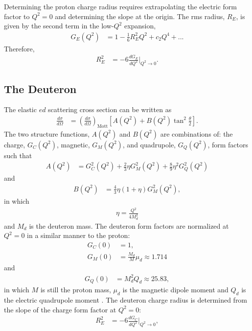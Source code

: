\documentclass[aps,prd,twocolumn,groupedaddress,10pt]{revtex4-1}
\begin{document}
Determining the proton charge radius requires extrapolating the electric form factor to $Q^2=0$ and determining the slope at the origin. The rms radius, $R_E$, is given by the second term in the low-$Q^2$ expansion,
\begin{align}
G_E(Q^2) &= 1- \frac{1}{6}R_E^2Q^2+c_2 Q^4 + ...
\end{align}
Therefore,
\begin{align*}
R_E^2 &= -6 \frac{dG_E}{dQ^2} \bigg|_{Q^2\rightarrow0}.
\end{align*}

\subsection{The Deuteron}

The elastic $ed$ scattering cross section can be written as
\begin{align}
\frac{d\sigma}{d\Omega} &= \left( \frac{d\sigma}{d\Omega} \right)_\text{Mott} \left[ A(Q^2) + B(Q^2) \tan^2 \frac{\theta}{2} \right].
\end{align}
The two structure functions, $A(Q^2)$ and $B(Q^2)$ are combinations of: the charge, $G_C(Q^2)$, magnetic, $G_M(Q^2)$, and quadrupole, $G_Q(Q^2)$, form factors such that
\begin{align}
A(Q^2) &= G_C^2(Q^2) + \frac{2}{3} \eta G_M^2(Q^2) + \frac{8}{9} \eta^2 G_Q^2(Q^2)
\end{align}
and
\begin{align}
B(Q^2) &= \frac{4}{3} \eta (1+\eta) G_M^2(Q^2),
\end{align}
in which
\begin{align}
\eta = \frac{Q^2}{4M_d^2}
\end{align}
and $M_d$ is the deuteron mass. The deuteron form factors are normalized at $Q^2 = 0$ in a similar manner to the proton:
\begin{align}
G_C(0) &= 1,\\
G_M(0) &= \frac{M_d}{M}{\mu_d} \approx 1.714
\end{align}
and 
\begin{align}
G_Q(0) &= M_d^2 Q_d \approx 25.83,
\end{align}
in which $M$ is still the proton mass, $\mu_d$ is the magnetic dipole moment \cite{Mohr} and $Q_d$ is the electric quadrupole moment \cite{Ericson}.
The deuteron charge radius is determined from the slope of the charge form factor at $Q^2=0$:
\begin{align}
R_E^2 &= -6 \frac{dG_C}{dQ^2} \bigg|_{Q^2\rightarrow0},
\end{align}
\end{document}
